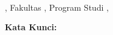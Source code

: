 {%
	
    \begin{center}
        \namaMahasiswa \\
        \texttt{\emailref{\emailKorespondensi}}
        
        \textbf{\MakeUppercase{\judulSebaris}}
        
        \daerahKampus, Fakultas \fakultas, Program Studi \prodi, \tahun
    \end{center}
    
    \vspace{0.4cm}
    
    \noindent\abstrak
    
    \vspace{0.4cm}
    
    \noindent\textbf{Kata Kunci:} \kataKunci
}

\newpage